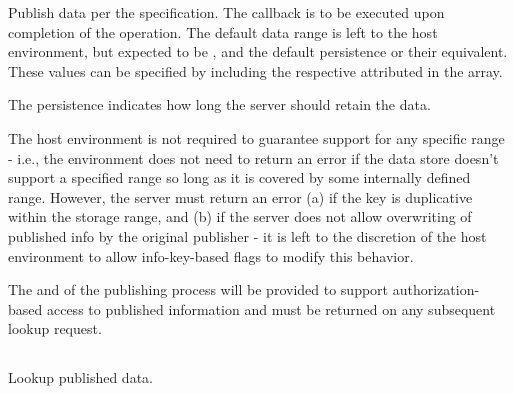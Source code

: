 \optattrend

\descr

Publish data per the  specification.
The callback is to be executed upon completion of the operation.
The default data range is left to the host environment, but expected to be , and the default persistence  or their equivalent.
These values can be specified by including the respective attributed in the  array.

The persistence indicates how long the server should retain the data.

\advicermstart
The host environment is not required to guarantee support for any specific range - i.e., the environment does not need to return an error if the data store doesn't support a specified range so long as it is covered by some internally defined range.
However, the server must return an error (a) if the key is duplicative within the storage range, and (b) if the server does not allow overwriting of published info by the original publisher - it is left to the discretion of the host environment to allow info-key-based flags to modify this behavior.

The  and  of the publishing process will be provided to support authorization-based access to published information and must be returned on any subsequent lookup request.
\advicermend

\subsection{}

\summary

Lookup published data.

\format


